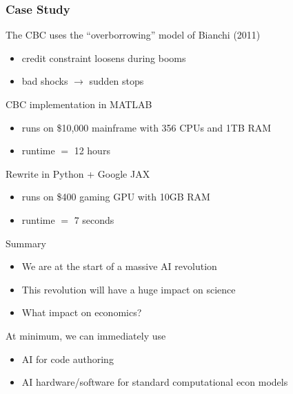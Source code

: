 \begin{frame}
    \frametitle{Case Study}

    The CBC uses the ``overborrowing'' model of Bianchi (2011)

    \begin{itemize}
        \item credit constraint loosens during booms
        \item bad shocks $\to$ sudden stops
    \end{itemize}

    \vspace{0.5em}
    CBC implementation in MATLAB 

    \begin{itemize}
        \item runs on \$10,000 mainframe with 356 CPUs and 1TB RAM
        \item runtime $=$ 12 hours
    \end{itemize}

    \pause
    \vspace{0.5em}
    Rewrite in Python + Google JAX

    \begin{itemize}
        \item runs on \$400 gaming GPU with 10GB RAM
        \item runtime $=$ 7 seconds
    \end{itemize}


\end{frame}


\begin{frame}{Summary}

    \begin{itemize}
        \item We are at the start of a massive AI revolution
        \medskip
        \item This revolution will have a huge impact on science
        \medskip
        \item What impact on economics?
    \end{itemize}

        \medskip
        \medskip

    At minimum, we can immediately use
    \begin{itemize}
        \item AI for code authoring
        \medskip
        \item AI hardware/software for standard computational econ models
    \end{itemize}


\end{frame}





